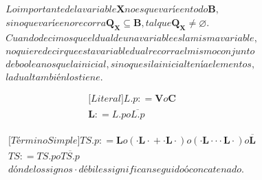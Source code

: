 \documentclass[
]{article}
\begin{document}
\begin{enumerate}
\begin{enumerate}
\begin{enumerate}
\begin{enumerate}
        \[\begin{matrix}
        {\mathit{Lo}\mathit{importante}\mathit{de}\mathit{la}\mathit{variable}\mathbf{X}\mathit{no}\mathit{es}\mathit{que}\mathit{varíe}\mathit{en}\mathit{todo}\mathbf{B},} \\
        {\mathit{sino}\mathit{que}\mathit{varíe}\mathit{en}o\mathit{recorra}{\mathbf{Q_{X}} \subseteq \mathbf{B}},\mathit{tal}\mathit{que}{\mathbf{Q_{X}} \neq \varnothing}.} \\
        {\mathit{Cuando}\mathit{decimos}\mathit{que}\mathit{el}\mathit{dual}\mathit{de}\mathit{una}\mathit{variable}\mathit{es}\mathit{la}\mathit{misma}\mathit{variable},} \\
        {\mathit{no}\mathit{quiere}\mathit{decir}\mathit{que}\mathit{esta}\mathit{variable}\mathit{dual}\mathit{recorra}\mathit{el}\mathit{mismo}\mathit{conjunto}} \\
        {\mathit{de}\mathit{booleanos}\mathit{que}\mathit{la}\mathit{inicial},\mathit{sino}\mathit{que}\mathit{si}\mathit{la}\mathit{inicial}\mathit{tenía}\mathit{elementos},} \\
        {\mathit{la}\mathit{dual}\mathit{también}\mathit{los}\mathit{tiene.}}
        \end{matrix}\]

        \[\begin{matrix}
        {{\lbrack\mathbf{\mathit{Literal}}\rbrack}\mathbf{\mathit{L.p}}{: =}\mathbf{V}o\mathbf{C}} \\
        {\mathbf{L}{: =}\mathbf{\mathit{L.p}}o\overline{\mathbf{\mathit{L.p}}}}
        \end{matrix}\]

        \[\begin{matrix}
        {{\lbrack\mathbf{\mathit{Término}\mathit{Simple}}\rbrack}\mathbf{\mathit{TS.p}}{: =}\mathbf{L}o\left( {{{\cdot \mathbf{L}} \cdot} + {{\cdot \mathbf{L}} \cdot}} \right)o\left( {{{{\cdot \mathbf{L}} \cdot \mathbf{\mathrm{\cdot}}} \cdot \mathbf{L}} \cdot} \right)o\overline{\mathbf{L}}} \\
        {\mathbf{\mathit{TS}}{: =}\mathbf{\mathit{TS.p}}o\mathbf{\overline{\mathit{TS.p}}}} \\
        {\mathit{dónde}\mathit{los}\mathit{signos} \cdot \mathit{débiles}\mathit{significan}\mathit{seguido}ó\mathit{concatenado.}}
        \end{matrix}\]


\end{enumerate}
\end{enumerate}
\end{enumerate}
\end{enumerate}
\end{document}
